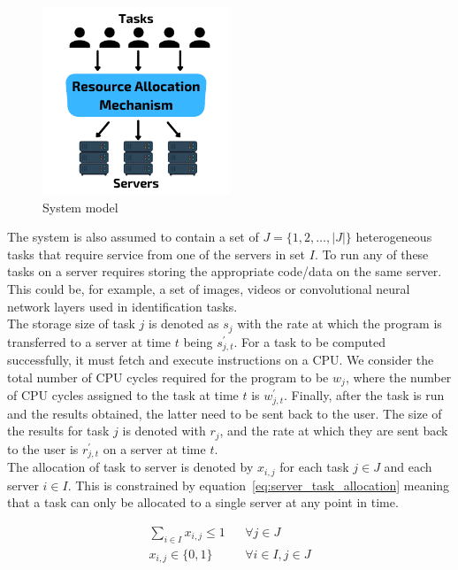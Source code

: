 \begin{figure}
    \centering
    \includegraphics[width=0.5\textwidth]{figures/system_model.pdf}
    \caption{System model}
    \label{fig:system_model}
\end{figure}

The system is also assumed to contain a set of $J = \{1,2,\ldots,\left| J \right|\}$ heterogeneous tasks that require
service from one of the servers in set $I$. To run any of these tasks on a server requires storing the appropriate
code/data on the same server. This could be, for example, a set of images, videos or convolutional neural network
layers used in identification tasks.\\
The storage size of task $j$ is denoted as $s_j$ with the rate at which the program is transferred to a server at time
$t$ being $s^{'}_{j,t}$. For a task to be computed successfully, it must fetch and execute instructions
on a CPU. We consider the total number of CPU cycles required for the program to be $w_j$, where the number of
CPU cycles assigned to the task at time $t$ is $w^{'}_{j,t}$. Finally, after the task is run and
the results obtained, the latter need to be sent back to the user. The size of the results for task $j$ is denoted with
$r_j$, and the rate at which they are sent back to the user is $r^{'}_{j,t}$ on a server at time $t$. \\
The allocation of task to server is denoted by $x_{i,j}$ for each task $j \in J$ and each server $i \in I$. This is
constrained by equation~\eqref{eq:server_task_allocation} meaning that a task can only be allocated to a single server
at any point in time.

\begin{align}
    \sum_{i \in I} x_{i,j} \leq 1 && \forall{j \in J} \label{eq:server_task_allocation} \\
    x_{i,j} \in \{0, 1\} && \forall{i \in I, j \in J} \label{eq:server_task_binary}
\end{align}

